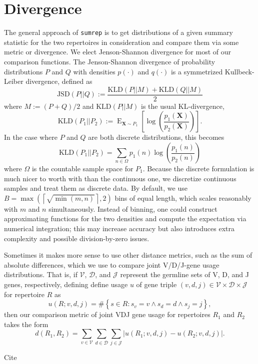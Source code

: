 \documentclass{article}
\begin{document}
\section*{Divergence}
The general approach of \texttt{sumrep} is to get distributions of a given summary statistic for the two repertoires in consideration and compare them via some metric or divergence.
We elect Jenson-Shannon divergence for most of our comparison functions.
The Jenson-Shannon divergence of probability distributions $P$ and $Q$ with densities $p(\cdot)$ and $q(\cdot)$ is a symmetrized Kullbeck-Leiber divergence, defined as
\begin{equation}
\text{JSD}\left(P || Q\right) := \frac{\text{KLD}\left(P || M\right) + \text{KLD}\left(Q || M\right)}{2}
\end{equation}
where $M := (P + Q)/2$ and $\text{KLD}(P || M)$ is the usual KL-divergence,
\begin{equation}
\text{KLD}\left(P_1 || P_2\right) := \operatorname{E}_{\mathbf X \sim P_1}\left[ \log\left(\frac{p_1(\mathbf X)}{p_2(\mathbf X)}\right) \right].
\end{equation}
In the case where $P$ and $Q$ are both discrete distributions, this becomes
\begin{equation}
\text{KLD}\left(P_1 || P_2\right) = \sum_{n \in \Omega} p_1(n) \log\left( \frac{p_1(n)}{p_2(n)} \right)
\end{equation}
where $\Omega$ is the countable sample space for $P_1$.
Because the discrete formulation is much nicer to worth with than the continuous one, we discretize continuous samples and treat them as discrete data.
By default, we use $B = \max\left(\left\lceil \sqrt{\min(m, n)} \right \rceil, 2\right)$ bins of equal length, which scales reasonably with $m$ and $n$ simultaneously.
Instead of binning, one could construct approximating functions for the two densities and compute the expectation via numerical integration; this may increase accuracy but also introduces extra complexity and possible division-by-zero issues.

Sometimes it makes more sense to use other distance metrics, such as the sum of absolute differences, which we use to compare joint V/D/J-gene usage distributions. 
That is, if $\mathcal V$, $\mathcal D$, and $\mathcal J$ represent the germline sets of V, D, and J genes, respectively, 
defining define usage $u$ of gene triple $(v, d, j) \in \mathcal V \times \mathcal D \times \mathcal J$ for repertoire $R$ as
\begin{equation}
u(R; v, d, j) = \#\left\{s \in R: s_v = v \land s_d = d \land s_j = j\right\},
\end{equation}
then our comparison metric of joint VDJ gene usage for repertoires $R_1$ and $R_2$ takes the form
\begin{equation}
d(R_1, R_2) = \sum_{v \in \mathcal V} \sum_{d \in \mathcal D} \sum_{j \in \mathcal J} \left| u(R_1; v, d, j) - u(R_2; v, d, j) \right|.
\end{equation}


Cite \cite{Felsenstein1981-zs}



\end{document}
